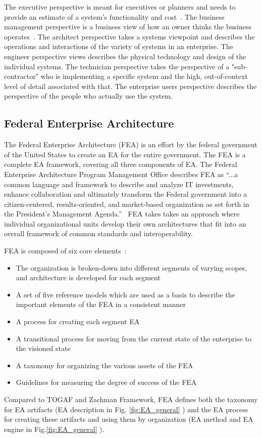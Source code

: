 The executive perspective is meant for executives or planners and needs to provide an estimate of a system's functionality and cost~\cite{jungle2004}. The business management perspective is a business view of how an owner thinks the business operates~\cite{Zachman2000}. The architect perspective takes a systems viewpoint and describes the operations and interactions of the variety of systems in an enterprise. The engineer perspective views describes the physical technology and design of the individual systems. The technician perspective takes the perspective of a "sub-contractor" who is implementing a specific system and the high, out-of-context level of detail associated with that. The enterprise users perspective describes the perspective of the people who actually use the system. 
 


\subsection{Federal Enterprise Architecture}
The Federal Enterprise Architecture (FEA) is an effort by the federal government of the United States to create an EA for the entire government. The FEA is a complete EA framework, covering all three components of EA. The Federal Enterprise Architecture Program Management Office describes FEA as ``...a common language and framework to describe and analyze IT investments, enhance collaboration and ultimately transform the Federal government into a citizen-centered, results-oriented, and market-based organization as set forth in the President's Management Agenda.''~\cite{FEA_PMO2007} FEA takes takes an approach where individual organizational units develop their own architectures that fit into an overall framework of common standards and interoperability.

FEA is composed of six core elements~\cite{sessions2007}:
\begin{itemize}
    \item The organization is broken-down into different segments of varying scopes, and architecture is developed for each segment
    \item A set of five reference models which are used as a basis to describe the important elements of the FEA in a consistent manner
    \item A process for creating each segment EA
    \item A transitional process for moving from the current state of the enterprise to the visioned state
    \item A taxonomy for organizing the various assets of the FEA
    \item Guidelines for measuring the degree of success of the FEA
\end{itemize}
Compared to TOGAF and Zachman Framework, FEA defines both the taxonomy for EA artifacts (EA description in Fig. \ref{fig:EA_general} ) and the EA process for creating these artifacts and using them by organization (EA method and EA engine in Fig.\ref{fig:EA_general} ). 

